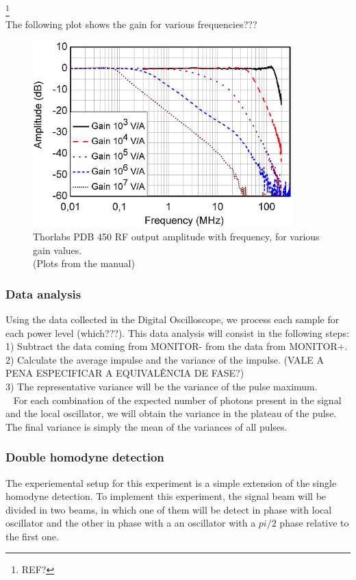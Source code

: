 \begin{bibunit}[plain]
\footnote{REF?}
\\
The following plot shows the gain for various frequencies???
\begin{figure}[H]
	\centering
	\includegraphics[width=10cm]{./sdf/optical_detection/figures/thorlabs-manual-gain-spec-rf.png}
	\caption{Thorlabs PDB 450 RF output amplitude with frequency, for various gain values.\\(Plots from the manual)}
\end{figure}
\subsubsection{Data analysis}
%
Using the data collected in the Digital Oscilloscope, we process each sample for each power level (which???).
This data analysis will consist in the following steps:
1) Subtract the data coming from MONITOR- from the data from MONITOR+.\\
2) Calculate the average impulse and the variance of the impulse. (VALE A PENA ESPECIFICAR A EQUIVALÊNCIA DE FASE?)\\
3) The representative variance will be the variance of the pulse maximum.\\\
%
For each combination of the expected number of photons present in the signal and the local oscillator, we will obtain the variance in the plateau of the pulse. The final variance is simply the mean of the variances of all pulses.
%

\subsubsection{Double homodyne detection}
%
The experiemental setup for this experiment is a simple extension of the single homodyne detection. To implement this experiment, the signal beam will be divided in two beams, in which one of them will be detect in phase with local oscillator and the other in phase with a an oscillator with a $pi/2$ phase relative to the first one.
%


\end{bibunit}
